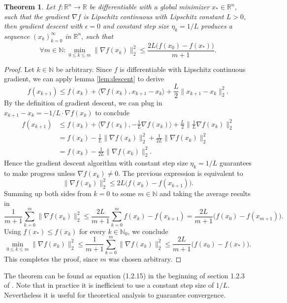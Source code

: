 \documentclass[11pt, a4paper]{article}
\newtheorem{theorem}{Theorem}[section]
\newcommand{\N}{\mathbb{N}}
\newcommand{\R}{\mathbb{R}}
\begin{document}
\begin{theorem} \label{thm:descent}
Let $f: \R^n \to \R$ be differentiable with a global minimizer $x_* \in \R^n$, such that the gradient $\nabla f$ is Lipschitz continuous with Lipschitz constant $L>0$, then gradient descent with $\epsilon = 0$ and constant step size $\eta_k = 1/L$ produces a sequence $(x_k)_{k=0}^\infty$ in $\R^n$, such that 
\[ \forall m \in \N : \min_{0 \leq k \leq m} \big \| \nabla f(x_k) \big \|_2^2 \leq \frac{2L \big ( f(x_0) - f(x_*) \big )}{m+1}. \]
\end{theorem}

\begin{proof}
Let $k \in \N$ be arbitrary. Since $f$ is differentiable with Lipschitz continuous gradient, we can apply lemma \ref{lem:descent} to derive
\[  f(x_{k+1}) \leq f(x_k) + \big \langle \nabla f(x_k) , x_{k+1} -x_k \big \rangle + \frac{L}{2} \big \| x_{k+1} - x_k \big \|_2^2. \]
By the definition of gradient descent, we can plug in $x_{k+1} - x_k = - 1/L \cdot \nabla f(x_k)$ to conclude
\[ \begin{split} 
f(x_{k+1}) 
&\leq f(x_k) + \big \langle \nabla f(x_k) , - \frac{1}{L} \nabla f(x_k) \big \rangle + \frac{L}{2} \big \| \frac{1}{L} \nabla f(x_k) \big \|_2^2 \\\
&= f(x_k) - \frac{1}{L} \big \| \nabla f(x_k) \big \|_2^2 + \frac{1}{2L} \big \| \nabla f(x_k) \big \|_2^2 \\\
&= f(x_k) - \frac{1}{2L} \big \| \nabla f(x_k) \big \|_2^2.
\end{split} \]
Hence the gradient descent algorithm with constant step size $\eta_k = 1/L$ guarantees to make progress unless $\nabla f(x_k) \neq 0$. The previous expression is equivalent to
\[ \big \| \nabla f(x_k) \big \|_2^2 \leq 2L \big ( f(x_k) - f(x_{k+1}) \big ). \]
Summing up both sides from $k=0$ to some $m \in \N$ and taking the average results in
\[ \frac{1}{m+1} \sum_{k=0}^{m} \big \| \nabla f(x_k) \big \|_2^2 \leq \frac{2L}{m+1} \sum_{k=0}^{m} f(x_k) - f(x_{k+1}) = \frac{2L}{m+1} \big ( f(x_0) - f(x_{m+1}) \big ). \]
Using $f(x_*) \leq f(x_k)$ for every $k \in \N_0$, we conclude
\[ \min_{0 \leq k \leq m} \big \| \nabla f(x_k) \big \|_2^2 \leq \frac{1}{m+1} \sum_{k=0}^{m} \big \| \nabla f(x_k) \big \|_2^2 \leq \frac{2L}{m+1} \big ( f(x_0) - f(x_*) \big ). \]
This completes the proof, since $m$ was chosen arbitrary.
\end{proof}

The theorem can be found as equation (1.2.15) in the beginning of section 1.2.3 of \cite{ConvexOptimization}. Note that in practice it is inefficient to use a constant step size of $1/L$. Nevertheless it is useful for theoretical analysis to guarantee convergence. \\
\end{document}
